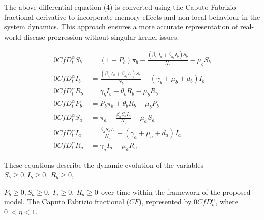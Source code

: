 \documentclass[10pt]{NSP1}
\begin{document}
The above differential equation (4) is converted using the Caputo-Fabrizio fractional derivative to incorporate memory effects and non-local behaviour in the system dynamics. This approach ensures a more accurate representation of real-world disease progression without singular kernel issues.

\begin{equation}
\begin{aligned}
{0CfD}_{t}^{\alpha}S_{b} &= \left( 1 - P_{b} \right)\pi_{b} - \frac{\left( \beta_{b_{1}}I_{a} + \beta_{b_{2}}I_{b} \right)S_{b}}{N_{b}} - \mu_{b}S_{b} \\
{0CfD}_{t}^{\alpha}I_{b} &= \frac{\left( \beta_{b_{1}}I_{a} + \beta_{b_{2}}I_{b} \right)S_{b}}{N_{b}} - \left( \gamma_{b} + \mu_{b} + d_{b} \right)I_{b} \\
{0CfD}_{t}^{\alpha}R_{b}\ &= \gamma_{b}I_{b} - \theta_{b}R_{b} - \mu_{b}R_{b} \\
{0CfD}_{t}^{\alpha}P_{b}\ &= P_{b}\pi_{b} + \theta_{b}R_{b} - \mu_{b}P_{b} \\
{0CfD}_{t}^{\alpha}S_{a}\ &= \pi_{a} - \frac{\beta_{a}S_{a}I_{a}}{N_{a}} - \mu_{a}S_{a} \\
{0CfD}_{t}^{\alpha}I_{a} &= \frac{\beta_{a}S_{a}I_{a}}{N_{a}} - \left( \gamma_{a} + \mu_{a} + d_{a} \right)I_{a} \\
{0CfD}_{t}^{\alpha}R_{a} &= \gamma_{a}I_{a} - \mu_{a}R_{a}
\end{aligned}
\end{equation}

These equations describe the dynamic evolution of the variables \(S_{b} \geq 0,I_{b} \geq 0,\ R_{b} \geq 0,\)

\(P_{b} \geq 0,S_{a} \geq 0,\ I_{a} \geq 0,\ R_{a} \geq 0\ \ \)over time within the framework of the proposed model. The Caputo Fabrizio fractional (\(CF\)), represented by \({0CfD}_{t}^{\alpha}\), where \(0\  < \eta < 1.\)
\end{document}
